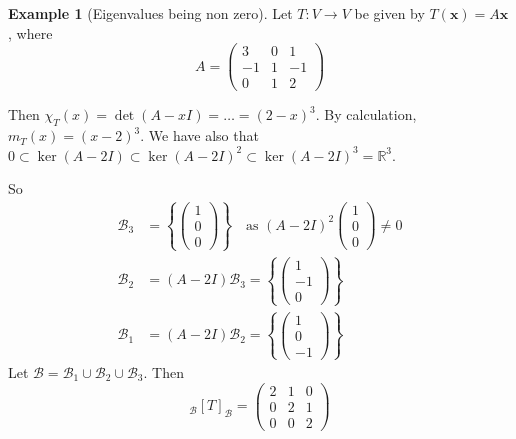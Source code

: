 \documentclass[10pt,fleqn]{article}
\newcommand{\reals}{\mathbb{R}}
\newcommand{\basis}{\mathcal{B}}
\newcommand{\vc}[1]{\boldsymbol{#1}}
\theoremstyle{definition} \newtheorem{defn}{Definition}[section]
\theoremstyle{plain}      \newtheorem{thm}[defn]{Theorem}
\theoremstyle{plain}      \newtheorem{prop}[defn]{Proposition}
\theoremstyle{plain}      \newtheorem{lem}[defn]{Lemma}
\theoremstyle{plain}      \newtheorem{cor}[defn]{Corollary}
\theoremstyle{plain}      \newtheorem{ad}[defn]{Addendum}
\theoremstyle{definition} \newtheorem{ex}[defn]{Example}
\theoremstyle{definition} \newtheorem{rem}[defn]{Remark}
\numberwithin{equation}{subsection}
\begin{document}
\begin{ex}[Eigenvalues being non zero]
    Let $T:V\to V$ be given by $T(\vc{x})=A\vc{x}$, where
    \[
        A=
        \left(
        \begin{array}{rrr}
            3&0&1\\
            -1&1&-1\\
            0&1&2
        \end{array}
        \right)
    \]

    Then $\chi_T(x)=\det(A-xI)=\ldots=(2-x)^3$.
    By calculation, $m_T(x)=(x-2)^3$.
    We have also that $0\subset\ker(A-2I)\subset\ker(A-2I)^2\subset\ker(A-2I)^3=\reals^3$.

    So
    \begingroup
    \renewcommand{\arraystretch}{0.7}
    \begin{align*}
        \basis_3
        &=
        \left\{
        \left(
        \begin{array}{c}
            1\\0\\0
        \end{array}
        \right)
        \right\}\quad\text{as }
        (A-2I)^2
        \left(
        \begin{array}{c}
            1\\0\\0
        \end{array}
        \right)\neq
        0\\
        \basis_2
        &=
        (A-2I)\basis_3=
        \left\{
        \left(
        \begin{array}{r}
            1\\-1\\0
        \end{array}
        \right)
        \right\}\\
        \basis_1
        &=
        (A-2I)\basis_2=
        \left\{
        \left(
        \begin{array}{r}
            1\\0\\-1
        \end{array}
        \right)
        \right\}
    \end{align*}
    \endgroup
    Let $\basis=\basis_1\cup\basis_2\cup\basis_3$.
    Then
    \[
        _{\basis}[T]_{\basis}=
        \left(
        \begin{array}{ccc}
            2&1&0\\
            0&2&1\\
            0&0&2
        \end{array}
        \right)
    \]
\end{ex}
\end{document}
